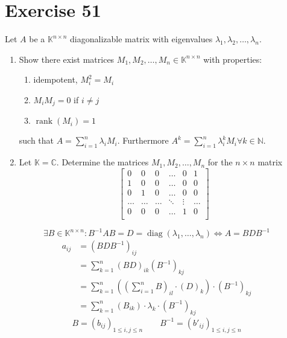 \documentclass[a4paper]{article}
\theoremstyle{definition}
\begin{document}
\section*{Exercise 51}
\begin{ex}
  Let $A$ be a $\mathbb K^{n\times n}$ diagonalizable matrix with eigenvalues $\lambda_1, \lambda_2, \dots, \lambda_n$.
  \begin{enumerate}
    \item Show there exist matrices $M_1, M_2, \dots, M_n \in \mathbb K^{n\times n}$ with properties:
      \begin{enumerate}
        \item idempotent, $M_i^2 = M_i$
        \item $M_i M_j = 0$ if $i \neq j$
        \item $\operatorname{rank}(M_i) = 1$
      \end{enumerate}
      such that $A = \sum_{i=1}^n \lambda_i M_i$. Furthermore $A^k = \sum_{i=1}^n \lambda_i^k M_i \forall k \in \mathbb N$.
    \item Let $\mathbb K = \mathbb C$. Determine the matrices $M_1, M_2, \dots, M_n$ for the $n\times n$ matrix
      \[
        \begin{bmatrix}
          0 & 0 & 0 & \dots & 0 & 1 \\
          1 & 0 & 0 & \dots & 0 & 0 \\
          0 & 1 & 0 & \dots & 0 & 0 \\
          \ldots & \ldots & \ldots & \ddots & \vdots & \ldots \\
          0 & 0 & 0 & \dots & 1 & 0 \\
        \end{bmatrix}
      \]
  \end{enumerate}
\end{ex}

\[ \exists B \in \mathbb K^{n\times n}: B^{-1} AB = D = \operatorname{diag}(\lambda_1, \dots, \lambda_n) \iff A = BDB^{-1} \]
\begin{align*}
  a_{ij} &= (BDB^{-1})_{ij} \\
         &= \sum_{k=1}^n (BD)_{ik} (B^{-1})_{kj} \\
         &= \sum_{k=1}^n \left((\sum_{i=1}^n B)_{il} \cdot (D)_k\right) \cdot (B^{-1})_{kj} \\
         &= \sum_{k=1}^n (B_{ik}) \cdot \lambda_k \cdot (B^{-1})_{kj}
\end{align*}
\[ B = (b_{ij})_{1 \leq i, j \leq n} \qquad B^{-1} = (b'_{ij})_{1 \leq i,j \leq n} \]
\end{document}
